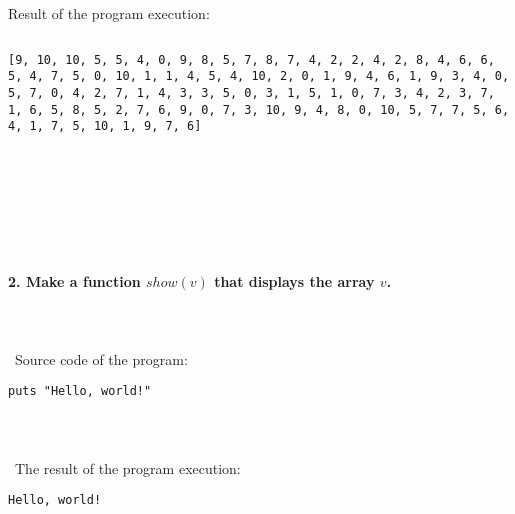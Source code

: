 \documentclass{article}
\begin{document}
\paragraph{}\

	Result of the program execution:
\begin{verbatim}

\end{verbatim}
\noindent \texttt{[9, 10, 10, 5, 5, 4, 0, 9, 8, 5, 7, 8, 7, 4, 2, 2, 4, 2, 8, 4, 6, 6, 5, 4, 7, 5, 0, 10, 1, 1, 4, 5, 4, 10, 2, 0, 1, 9, 4, 6, 1, 9, 3, 4, 0, 5, 7, 0, 4, 2, 7, 1, 4, 3, 3, 5, 0, 3, 1, 5, 1, 0, 7, 3, 4, 2, 3, 7, 1, 6, 5, 8, 5, 2, 7, 6, 9, 0, 7, 3, 10, 9, 4, 8, 0, 10, 5, 7, 7, 5, 6, 4, 1, 7, 5, 10, 1, 9, 7, 6]}

\paragraph{}\
\paragraph{}\
\paragraph{}\

	\paragraph{2. Make a function \(show(v)\) that displays the array \(v\). }\

\paragraph{}\	
Source code of the program:
	
\begin{verbatim} 
puts "Hello, world!"
\end{verbatim}	

\paragraph{}\	
\paragraph{}\
	The result of the program execution:
	
\begin{verbatim} 
Hello, world!
\end{verbatim}
	
\end{document}
